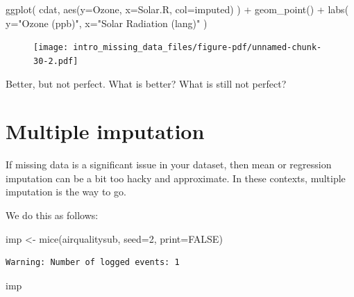 \documentclass[
  letterpaper,
  DIV=11,
  numbers=noendperiod]{scrreprt}
\newenvironment{Shaded}{\begin{snugshade}}{\end{snugshade}}
\newcommand{\AttributeTok}[1]{\textcolor[rgb]{0.49,0.56,0.16}{#1}}
\newcommand{\ConstantTok}[1]{\textcolor[rgb]{0.53,0.00,0.00}{#1}}
\newcommand{\DecValTok}[1]{\textcolor[rgb]{0.25,0.63,0.44}{#1}}
\newcommand{\FunctionTok}[1]{\textcolor[rgb]{0.02,0.16,0.49}{#1}}
\newcommand{\NormalTok}[1]{\textcolor[rgb]{0.00,0.44,0.13}{#1}}
\newcommand{\OtherTok}[1]{\textcolor[rgb]{0.00,0.44,0.13}{#1}}
\newcommand{\SpecialCharTok}[1]{\textcolor[rgb]{0.25,0.44,0.63}{#1}}
\newcommand{\StringTok}[1]{\textcolor[rgb]{0.25,0.44,0.63}{#1}}
\begin{document}
\begin{Shaded}
\begin{Highlighting}[]
  \FunctionTok{ggplot}\NormalTok{( cdat, }\FunctionTok{aes}\NormalTok{(}\AttributeTok{y=}\NormalTok{Ozone, }\AttributeTok{x=}\NormalTok{Solar.R, }\AttributeTok{col=}\NormalTok{imputed) ) }\SpecialCharTok{+}
    \FunctionTok{geom\_point}\NormalTok{() }\SpecialCharTok{+}
    \FunctionTok{labs}\NormalTok{( }\AttributeTok{y=}\StringTok{"Ozone (ppb)"}\NormalTok{, }\AttributeTok{x=}\StringTok{"Solar Radiation (lang)"}\NormalTok{ )}
\end{Highlighting}
\end{Shaded}

\begin{figure}[H]

{\centering \texttt{[image: intro\_missing\_data\_files/figure-pdf/unnamed-chunk-30-2.pdf]}

}

\end{figure}

Better, but not perfect. What is better? What is still not perfect?

\hypertarget{multiple-imputation}{%
\section{Multiple imputation}\label{multiple-imputation}}

If missing data is a significant issue in your dataset, then mean or
regression imputation can be a bit too hacky and approximate. In these
contexts, multiple imputation is the way to go.

We do this as follows:

\begin{Shaded}
\begin{Highlighting}[]
\NormalTok{  imp }\OtherTok{\textless{}{-}} \FunctionTok{mice}\NormalTok{(airqualitysub, }\AttributeTok{seed=}\DecValTok{2}\NormalTok{, }\AttributeTok{print=}\ConstantTok{FALSE}\NormalTok{)}
\end{Highlighting}
\end{Shaded}

\begin{verbatim}
Warning: Number of logged events: 1
\end{verbatim}

\begin{Shaded}
\begin{Highlighting}[]
\NormalTok{  imp}
\end{Highlighting}
\end{Shaded}
\end{document}
